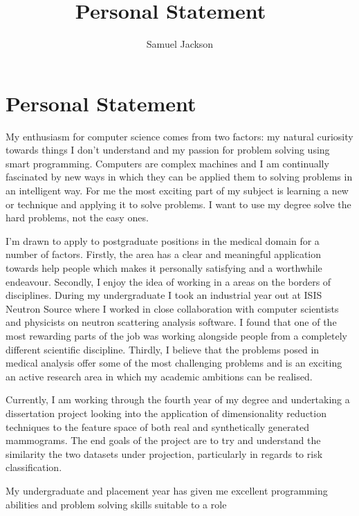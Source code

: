 \documentclass[paper=a4, fontsize=11pt]{scrartcl}	%
\title{
	\vspace{-0.5in} 	\usefont{OT1}{bch}{b}{n}
	 Personal Statement \
}
\author{
	\usefont{OT1}{bch}{m}{n} Samuel Jackson
}
\date{}
\numberwithin{equation}{section}															%
\numberwithin{figure}{section}																%
\numberwithin{table}{section}
\begin{document}
\section*{Personal Statement}
My enthusiasm for computer science comes from two factors: my natural curiosity towards things I don't understand and my passion for problem solving using smart programming. Computers are complex machines and I am continually fascinated by new ways in which they can be applied them to solving problems in an intelligent way. For me the most exciting part of my subject is learning a new or technique and applying it to solve problems. I want to use my degree solve the hard problems, not the easy ones.

I'm drawn to apply to postgraduate positions in the medical domain for a number of factors. Firstly, the area has a clear and meaningful application towards help people which makes it personally satisfying and a worthwhile endeavour. Secondly, I enjoy the idea of working in a areas on the borders of disciplines. During my undergraduate I took an industrial year out at ISIS Neutron Source where I worked in close collaboration with computer scientists and physicists on neutron scattering analysis software. I found that one of the most rewarding parts of the job was working alongside people from a completely different scientific discipline. Thirdly, I believe that the problems posed in medical analysis offer some of the most challenging problems and is an exciting an active research area in which my academic ambitions can be realised.

Currently, I am working through the fourth year of my degree and undertaking a dissertation project looking into the application of dimensionality reduction techniques to the feature space of both real and synthetically generated mammograms. The end goals of the project are to try and understand the similarity the two datasets under projection, particularly in regards to risk classification.

My undergraduate and placement year has given me excellent programming abilities and problem solving skills suitable to a role
\end{document}
